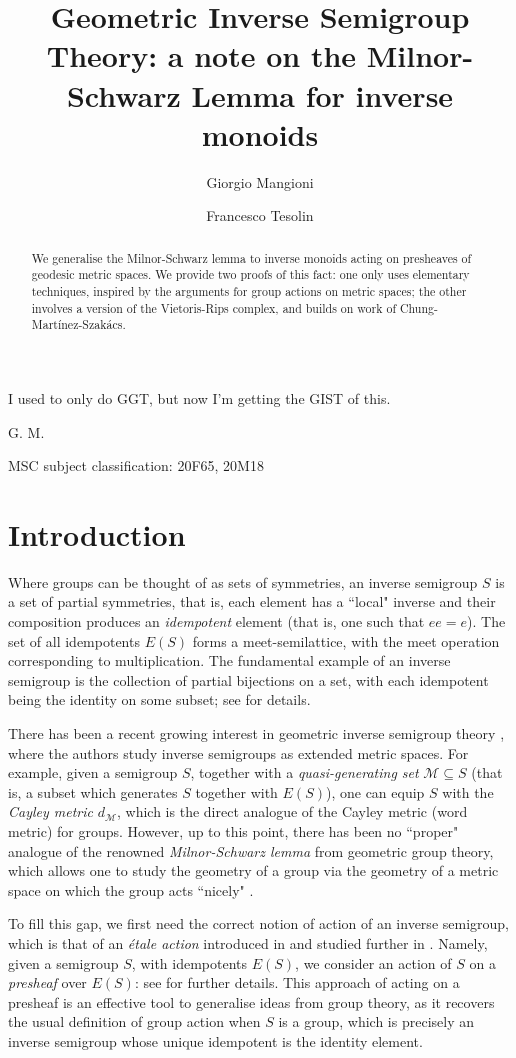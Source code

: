 \documentclass[svgnames]{amsart}
\title[Milnor-Schwarz for inverse monoids]{Geometric Inverse Semigroup Theory: a note on the Milnor-Schwarz Lemma for inverse monoids}
\author[G. Mangioni]{Giorgio Mangioni}
\author[F. Tesolin]{Francesco Tesolin}
\theoremstyle{plain}
\theoremstyle{definition}
\begin{document}
\begin{abstract} We generalise the Milnor-Schwarz lemma to inverse monoids acting on presheaves of geodesic metric spaces. We provide two proofs of this fact: one only uses elementary techniques, inspired by the arguments for group actions on metric spaces; the other involves a version of the Vietoris-Rips complex, and builds on work of Chung-Martínez-Szakács. 
\end{abstract}
\maketitle


\epigraph{I used to only do GGT, but now I'm getting the GIST of this.}{G. M.}

\small{MSC subject classification: 20F65, 20M18}
\section*{Introduction}
Where groups can be thought of as sets of symmetries, an inverse semigroup $S$ is a set of partial symmetries, that is, each element has a ``local"
inverse and their composition produces an \emph{idempotent} element (that is, one such that $ee=e$). The set of all idempotents $E(S)$ forms a meet-semilattice, with the meet operation corresponding to multiplication.
The fundamental example of an inverse semigroup is the collection of partial bijections on a set, with each idempotent being the identity on some subset; see  for details.

There has been a recent growing interest in geometric inverse semigroup theory \cite{gray2013groups,magan2021amenability, gray2022algorithmic,Chung_Martinez_szakacs}, where the authors study inverse semigroups as extended metric spaces. For example, given a semigroup $S$, together with a \emph{quasi-generating set} $\mathcal M\subseteq S$ (that is, a subset which generates $S$ together with $E(S)$), one can equip $S$ with the \emph{Cayley metric} $d_{\mathcal{M}}$, which is the direct analogue of the Cayley metric (word metric) for groups. However, up to this point, there has been
no ``proper" analogue of the renowned \emph{Milnor-Schwarz lemma} from geometric group theory, which allows one to study the geometry of a group via the geometry of a metric space on which the group acts ``nicely" \cite{Schwarz, Milnor}. 

To fill this gap, we first need the correct notion of action of an inverse semigroup, which is that of an \emph{étale action} introduced in \cite{Steinberg_morita_eq} and studied further in \cite{tesolin2025generalisationmunnsemigroup}. Namely, given a semigroup $S$, with idempotents $E(S)$, we consider an action of $S$ on a \emph{presheaf} over $E(S)$: see  for further details. This approach of acting on a presheaf is an effective tool to generalise ideas from group theory, as it recovers the usual definition of group action when $S$ is a group, which is precisely an inverse semigroup whose unique idempotent is the identity element.
\end{document}
